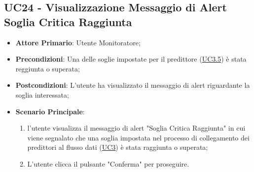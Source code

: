 
\label{par:UC24}
	\subsection{UC24 - Visualizzazione Messaggio di Alert Soglia Critica Raggiunta}
		\begin{itemize}
			\item\textbf{Attore Primario}: Utente Monitoratore;
			\item\textbf{Precondizioni}: Una delle soglie impostate per il predittore (\hyperref[par:UC3.5]{UC3.5}) è stata reggiunta o superata;
			\item\textbf{Postcondizioni}: L’utente ha visualizzato il messaggio di alert riguardante la soglia interessata;
			\item\textbf{Scenario Principale}: 
				\begin{enumerate} 
					\item l’utente visualizza il messaggio di alert "Soglia Critica Raggiunta" in cui viene segnalato che una soglia impostata nel processo di collegamento dei predittori al flusso dati (\hyperref[par:UC3]{UC3}) è stata raggiunta o superata;
					\item L'utente clicca il pulsante "Conferma" per proseguire.		
				\end{enumerate}		
		\end{itemize}
	




